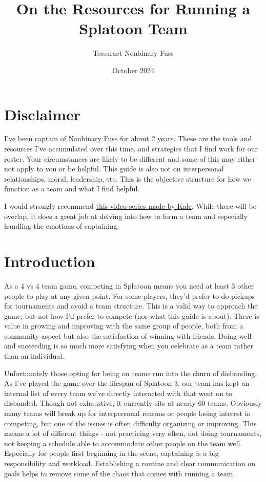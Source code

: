 \documentclass[12pt]{article}
\title{On the Resources for Running a Splatoon Team}
\author{Tessaract Nonbinary Fuss }
\date{October 2024}
\begin{document}
\maketitle

\section{Disclaimer}
I've been captain of Nonbinary Fuss for about 2 years. These are the tools and resources I've accumulated over this time, and strategies that I find work for our roster. Your circumstances are likely to be different and some of this may either not apply to you or be helpful. This guide is also not on interpersonal relationships, moral, leadership, etc. This is the objective structure for how we function as a team and what I find helpful. 

I would strongly recommend \href{https://www.youtube.com/watch?v=Wtp-X-1W5rU&list=PLiBtcHtdkvJZk7OhLVf9o7qzIgXywZEID&pp=iAQB}{this video series made by Kale}. While there will be overlap, it does a great job at delving into how to form a team and especially handling the emotions of captaining. 



\section{Introduction}
As a 4 vs 4 team game, competing in Splatoon means you need at least 3 other people to play at any given point. For some players, they'd prefer to do pickups for tournaments and avoid a team structure. This is a valid way to approach the game, but not how I'd prefer to compete (nor what this guide is about). There is value in growing and improving with the same group of people, both from a community aspect but also the satisfaction of winning with friends. Doing well and succeeding is so much more satisfying when you celebrate as a team rather than an individual. 

Unfortunately those opting for being on teams run into the churn of disbanding. As I've played the game over the lifespan of Splatoon 3, our team has kept an internal list of every team we've directly interacted with that went on to disbanded. Though not exhaustive, it currently sits at nearly 60 teams. Obviously many teams will break up for interpersonal reasons or people losing interest in competing, but one of the issues is often difficulty organizing or improving. This means a lot of different things - not practicing very often, not doing tournaments, not keeping a schedule able to accommodate other people on the team well. Especially for people first beginning in the scene, captaining is a big responsibility and workload. Establishing a routine and clear communication on goals helps to remove some of the chaos that comes with running a team.
\end{document}
